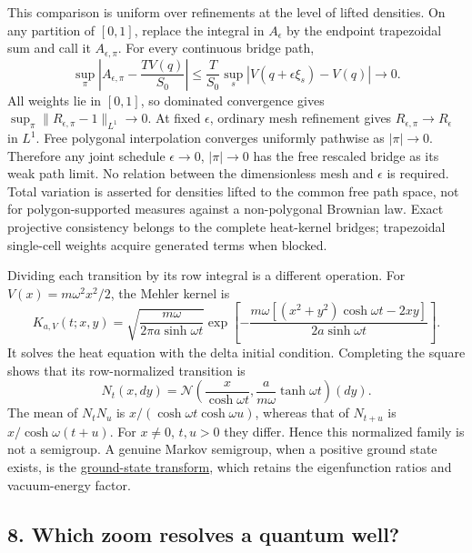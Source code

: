 \documentclass[11pt,a4paper]{article}
\begin{document}
This comparison is uniform over refinements at the level of lifted
densities. On any partition of \([0,1]\), replace the integral in
\(A_\epsilon\) by the endpoint trapezoidal sum and call it
\(A_{\epsilon,\pi}\). For every continuous bridge path, \[
 \sup_\pi\left|A_{\epsilon,\pi}-\frac{TV(q)}{S_0}\right|
 \le\frac T{S_0}\sup_s|V(q+\epsilon\xi_s)-V(q)|\longrightarrow0.
\] All weights lie in \([0,1]\), so dominated convergence gives
\(\sup_\pi\|R_{\epsilon,\pi}-1\|_{L^1}\to0\). At fixed \(\epsilon\),
ordinary mesh refinement gives \(R_{\epsilon,\pi}\to R_\epsilon\) in
\(L^1\). Free polygonal interpolation converges uniformly pathwise as
\(|\pi|\to0\). Therefore any joint schedule \(\epsilon\to0\),
\(|\pi|\to0\) has the free rescaled bridge as its weak path limit. No
relation between the dimensionless mesh and \(\epsilon\) is required.
Total variation is asserted for densities lifted to the common free path
space, not for polygon-supported measures against a non-polygonal
Brownian law. Exact projective consistency belongs to the complete
heat-kernel bridges; trapezoidal single-cell weights acquire generated
terms when blocked.

Dividing each transition by its row integral is a different operation.
For \(V(x)=m\omega^2x^2/2\), the Mehler kernel is \[
 K_{a,V}(t;x,y)=\sqrt{\frac{m\omega}{2\pi a\sinh\omega t}}
 \exp\!\left[-\frac{m\omega[(x^2+y^2)\cosh\omega t-2xy]}
                  {2a\sinh\omega t}\right].
\] It solves the heat equation with the delta initial condition.
Completing the square shows that its row-normalized transition is \[
 N_t(x,dy)=\mathcal N\!\left(
       \frac{x}{\cosh\omega t},\frac{a}{m\omega}\tanh\omega t
                                      \right)(dy).
 \tag{31}
\] The mean of \(N_tN_u\) is \(x/(\cosh\omega t\cosh\omega u)\), whereas
that of \(N_{t+u}\) is \(x/\cosh\omega(t+u)\). For \(x\ne0\), \(t,u>0\)
they differ. Hence this normalized family is not a semigroup. A genuine
Markov semigroup, when a positive ground state exists, is the
\href{constructive-qft-one-time.md\#3-arbitrary-time-refinement}{ground-state
transform}, which retains the eigenfunction ratios and vacuum-energy
factor.

\subsection{8. Which zoom resolves a quantum
well?}\label{which-zoom-resolves-a-quantum-well}

\protect{}\label{8-which-zoom-resolves-a-quantum-well}{}
\end{document}
